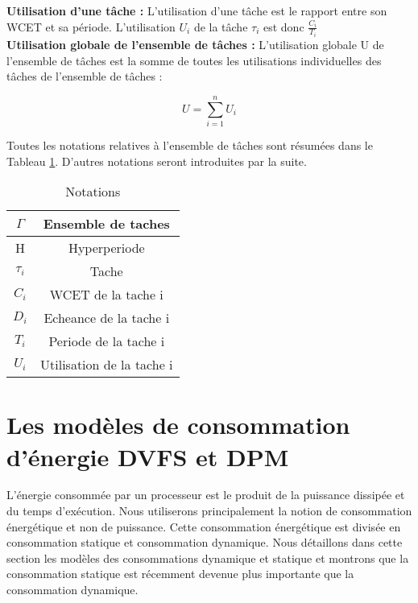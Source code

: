 \indent \textbf{Utilisation d’une tâche :} L’utilisation d’une tâche est le rapport entre son WCET et sa période. L’utilisation $U_i$ de la tâche $\tau_{i}$ est donc $\frac{C_i}{T_i}$
\\ \indent \textbf{Utilisation globale de l’ensemble de tâches :} L’utilisation globale U de l’ensemble de tâches est la somme de toutes les utilisations individuelles des tâches de l’ensemble de tâches :

\begin{equation}
U = \sum_{i=1}^{n} U_i
\end{equation}

Toutes les notations relatives à l’ensemble de tâches sont résumées dans le Tableau \ref{tab:recap}. D’autres notations seront introduites par la suite.
\begin{table}[h]
\begin{center}
\begin{tabular}{|c|c|}
 \hline $\Gamma$ & Ensemble de taches \\ 
 \hline H & Hyperperiode \\ 
 \hline $\tau_i$ & Tache \\ 
 \hline $C_i$ & WCET de la tache i \\ 
 \hline $D_i$ & Echeance de la tache i \\ 
 \hline $T_i$ & Periode de la tache i \\ 
 \hline $U_i$ & Utilisation de la tache i \\ 
 \hline 
 \end{tabular}
\end{center}
\caption{Notations} \label{tab:recap}
\end{table}
\section{Les modèles de consommation d'énergie DVFS et DPM}
\vspace{-1cm}
L’énergie consommée par un processeur est le produit de la puissance dissipée et du temps d’exécution. Nous utiliserons principalement la notion de consommation énergétique et non de puissance. Cette consommation énergétique est divisée en consommation statique et consommation dynamique. Nous détaillons dans cette section les modèles des consommations dynamique et statique et montrons que la consommation statique est récemment devenue plus importante que la consommation dynamique.
